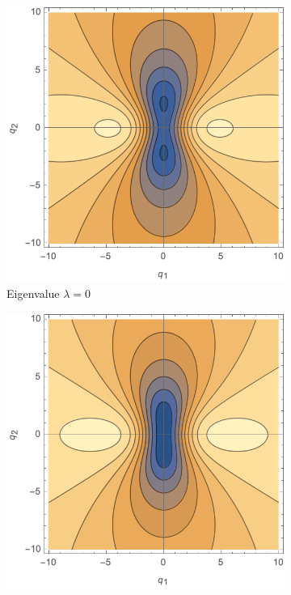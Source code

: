 \documentclass[a4paper, 11pt]{article}
\begin{document}
\begin{figure}
\centering
\begin{subfigure}[b]{0.45\textwidth}
\includegraphics[width=\textwidth]{A3Mean_lambda=000}
\caption{Eigenvalue $\lambda=0$}
\end{subfigure}
\begin{subfigure}[b]{0.45\textwidth}
\includegraphics[width=\textwidth]{A3Mean_lambda=025}

\end{subfigure}
\end{figure}
\end{document}
